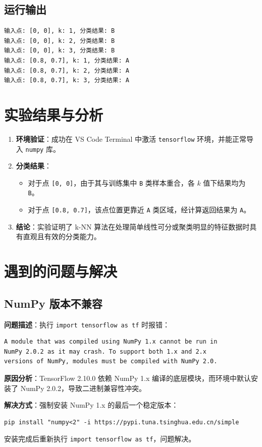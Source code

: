 \documentclass[10.5pt]{config}
\begin{document}
\subsection{运行输出}

\begin{verbatim}
输入点: [0, 0], k: 1, 分类结果: B
输入点: [0, 0], k: 2, 分类结果: B
输入点: [0, 0], k: 3, 分类结果: B
输入点: [0.8, 0.7], k: 1, 分类结果: A
输入点: [0.8, 0.7], k: 2, 分类结果: A
输入点: [0.8, 0.7], k: 3, 分类结果: A
\end{verbatim}

\section{实验结果与分析}
\begin{enumerate}
    \item \textbf{环境验证}：成功在 VS Code Terminal 中激活 \texttt{tensorflow} 环境，并能正常导入 \texttt{numpy} 库。
    \item \textbf{分类结果}：
    \begin{itemize}
        \item 对于点 \texttt{[0, 0]}，由于其与训练集中 \texttt{B} 类样本重合，各 $k$ 值下结果均为 \texttt{B}。
        \item 对于点 \texttt{[0.8, 0.7]}，该点位置更靠近 \texttt{A} 类区域，经计算返回结果为 \texttt{A}。
    \end{itemize}
    \item \textbf{结论}：实验证明了 k-NN 算法在处理简单线性可分或聚类明显的特征数据时具有直观且有效的分类能力。
\end{enumerate}

\section{遇到的问题与解决}

\subsection{NumPy 版本不兼容}

\textbf{问题描述}：执行 \texttt{import tensorflow as tf} 时报错：

\begin{verbatim}
A module that was compiled using NumPy 1.x cannot be run in
NumPy 2.0.2 as it may crash. To support both 1.x and 2.x
versions of NumPy, modules must be compiled with NumPy 2.0.
\end{verbatim}

\textbf{原因分析}：TensorFlow 2.10.0 依赖 NumPy 1.x 编译的底层模块，而环境中默认安装了 NumPy 2.0.2，导致二进制兼容性冲突。

\textbf{解决方式}：强制安装 NumPy 1.x 的最后一个稳定版本：

\begin{verbatim}
pip install "numpy<2" -i https://pypi.tuna.tsinghua.edu.cn/simple
\end{verbatim}

安装完成后重新执行 \texttt{import tensorflow as tf}，问题解决。
\end{document}

